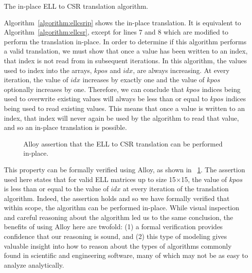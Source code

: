 \documentclass[sigconf]{acmart}
\begin{document}
\LinesNumbered
\begin{algorithm}

\caption{The in-place ELL to CSR translation algorithm.}
\label{algorithm:ellcsrip}
\end{algorithm}
\LinesNotNumbered

Algorithm~\ref{algorithm:ellcsrip} shows the in-place translation.  It is equivalent to Algorithm~\ref{algorithm:ellcsr}, except for lines 7 and 8 which are modified to perform the translation in-place.
In order to determine if this algorithm performs a valid translation, 
we must show that once a value has been written to an index, that index is not read from in subsequent iterations.  In this algorithm, the values used to index into the arrays, $kpos$ and $idx$, are always increasing.  At every iteration, the value of $idx$ increases by exactly one and the value of $kpos$ optionally increases by one.  Therefore, we can conclude that $kpos$ indices being used to overwrite existing values will always be less than or equal to $kpos$ indices being used to read existing values.
This means that once a value is written to an index, that index will never again be used by the algorithm to read that value, and so an in-place translation is possible.

\begin{figure}

\caption{Alloy assertion that the ELL to CSR translation can be performed in-place.}
\label{alloy:csrellip}
\end{figure}

This property can be formally verified using Alloy, as shown in \figurename~\ref{alloy:csrellip}.  The assertion used here states that for valid ELL matrices up to size 15$\times$15, the value of $kpos$ is less than or equal to the value of $idx$ at every iteration of the translation algorithm.  Indeed, the assertion holds and so we have formally verified that within scope, the algorithm can be performed in-place.  While visual inspection and careful reasoning about the algorithm led us to the same conclusion, the benefits of using Alloy here are twofold: (1) a formal verification provides confidence that our reasoning is sound, and (2) this type of modeling gives valuable insight into how to reason about the types of algorithms commonly found in scientific and engineering software, many of which may not be as easy to analyze analytically.



\end{document}
